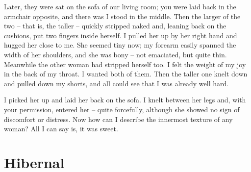 \documentclass{amsbook}
\begin{document}
Later, they were sat on the sofa of our living room; you were laid back in the armchair opposite, and there was I stood in the middle. Then the larger of the two -- that is, the taller -- quickly stripped naked and, leaning back on the cushions, put two fingers inside herself. I pulled her up by her right hand and hugged her close to me. She seemed tiny now; my forearm easily spanned the width of her shoulders, and she was bony -- not emaciated, but quite thin. Meanwhile the other woman had stripped herself too. I felt the weight of my joy in the back of my throat. I wanted both of them. Then the taller one knelt down and pulled down my shorts, and all could see that I was already well hard.

I picked her up and laid her back on the sofa. I knelt between her legs and, with your permission, entered her -- quite forcefully, although she showed no sign of discomfort or distress. Now how can I describe the innermost texture of any woman? All I can say is, it was sweet.

    \chapter{Hibernal}
\end{document}
